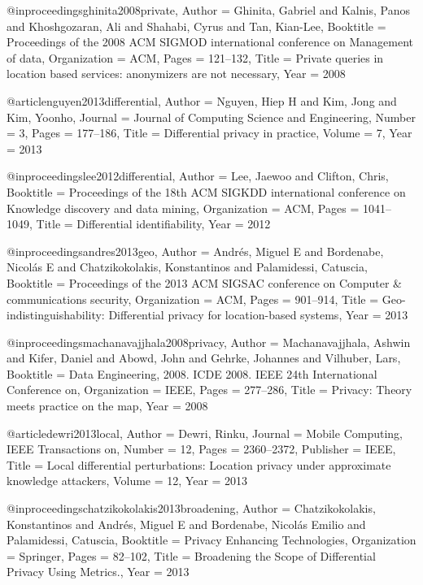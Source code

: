 {{@inproceedings{ghinita2008private,
	Author = {Ghinita, Gabriel and Kalnis, Panos and Khoshgozaran, Ali and Shahabi, Cyrus and Tan, Kian-Lee},
	Booktitle = {Proceedings of the 2008 ACM SIGMOD international conference on Management of data},
	Organization = {ACM},
	Pages = {121--132},
	Title = {Private queries in location based services: anonymizers are not necessary},
	Year = {2008}}



@article{nguyen2013differential,
	Author = {Nguyen, Hiep H and Kim, Jong and Kim, Yoonho},
	Journal = {Journal of Computing Science and Engineering},
	Number = {3},
	Pages = {177--186},
	Title = {Differential privacy in practice},
	Volume = {7},
	Year = {2013}}

@inproceedings{lee2012differential,
	Author = {Lee, Jaewoo and Clifton, Chris},
	Booktitle = {Proceedings of the 18th ACM SIGKDD international conference on Knowledge discovery and data mining},
	Organization = {ACM},
	Pages = {1041--1049},
	Title = {Differential identifiability},
	Year = {2012}}

@inproceedings{andres2013geo,
	Author = {Andr{\'e}s, Miguel E and Bordenabe, Nicol{\'a}s E and Chatzikokolakis, Konstantinos and Palamidessi, Catuscia},
	Booktitle = {Proceedings of the 2013 ACM SIGSAC conference on Computer \& communications security},
	Organization = {ACM},
	Pages = {901--914},
	Title = {Geo-indistinguishability: Differential privacy for location-based systems},
	Year = {2013}}

@inproceedings{machanavajjhala2008privacy,
	Author = {Machanavajjhala, Ashwin and Kifer, Daniel and Abowd, John and Gehrke, Johannes and Vilhuber, Lars},
	Booktitle = {Data Engineering, 2008. ICDE 2008. IEEE 24th International Conference on},
	Organization = {IEEE},
	Pages = {277--286},
	Title = {Privacy: Theory meets practice on the map},
	Year = {2008}}

@article{dewri2013local,
	Author = {Dewri, Rinku},
	Journal = {Mobile Computing, IEEE Transactions on},
	Number = {12},
	Pages = {2360--2372},
	Publisher = {IEEE},
	Title = {Local differential perturbations: Location privacy under approximate knowledge attackers},
	Volume = {12},
	Year = {2013}}

@inproceedings{chatzikokolakis2013broadening,
	Author = {Chatzikokolakis, Konstantinos and Andr{\'e}s, Miguel E and Bordenabe, Nicol{\'a}s Emilio and Palamidessi, Catuscia},
	Booktitle = {Privacy Enhancing Technologies},
	Organization = {Springer},
	Pages = {82--102},
	Title = {Broadening the Scope of Differential Privacy Using Metrics.},
	Year = {2013}}



}}
